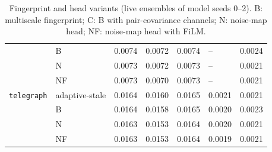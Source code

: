 \documentclass[11pt,a4paper]{article}
\newcommand{\reg}[1]{\texttt{#1}}
\begin{document}
\begin{table}[tp]
\begin{tabular}{@{}lllllll@{}}
 & B & 0.0074 & 0.0072 & 0.0074 & -- & 0.0024 \\
 & N & 0.0073 & 0.0072 & 0.0073 & -- & 0.0021 \\
 & NF & 0.0073 & 0.0070 & 0.0073 & -- & 0.0021 \\
\reg{telegraph} & adaptive-stale & 0.0164 & 0.0160 & 0.0165 & 0.0021 & 0.0021 \\
 & B & 0.0164 & 0.0158 & 0.0165 & 0.0020 & 0.0023 \\
 & N & 0.0163 & 0.0153 & 0.0164 & 0.0020 & 0.0021 \\
 & NF & 0.0163 & 0.0153 & 0.0164 & 0.0019 & 0.0021 \\
\bottomrule
\end{tabular}
\caption{Fingerprint and head variants (live ensembles of model seeds 0--2). B: multiscale
fingerprint; C: B with pair-covariance channels; N: noise-map head; NF: noise-map head with FiLM.}
\label{tab:variants}
\end{table}
\end{document}
